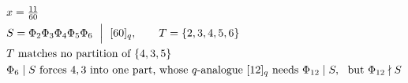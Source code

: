 \documentclass{article}
\begin{document}
\[
\begin{aligned}
&x=\tfrac{11}{60}\\
&S=\Phi_2\Phi_3\Phi_4\Phi_5\Phi_6\ \Bigm|\ [60]_q,\qquad T=\{2,3,4,5,6\}\\
&T\ \text{matches no partition of }\{4,3,5\}\\
&\Phi_6\mid S\ \text{forces }4,3\ \text{into one part, whose }q\text{-analogue }[12]_q\ \text{needs}\ \Phi_{12}\mid S,\ \ \text{but }\Phi_{12}\nmid S
\end{aligned}
\]
\end{document}
